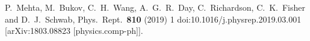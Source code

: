 \begin{thebibliography}{99}

P.~Mehta, M.~Bukov, C.~H.~Wang, A.~G.~R.~Day, C.~Richardson, C.~K.~Fisher and D.~J.~Schwab,
Phys.\ Rept.\  {\bf 810} (2019) 1
doi:10.1016/j.physrep.2019.03.001
[arXiv:1803.08823 [physics.comp-ph]].

\end{thebibliography}